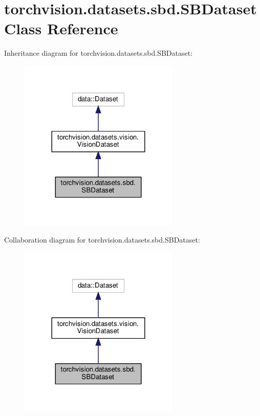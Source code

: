 \hypertarget{classtorchvision_1_1datasets_1_1sbd_1_1SBDataset}{}\section{torchvision.\+datasets.\+sbd.\+S\+B\+Dataset Class Reference}
\label{classtorchvision_1_1datasets_1_1sbd_1_1SBDataset}


Inheritance diagram for torchvision.\+datasets.\+sbd.\+S\+B\+Dataset\+:
\nopagebreak
\begin{figure}[H]
\begin{center}
\leavevmode
\includegraphics[width=216pt]{classtorchvision_1_1datasets_1_1sbd_1_1SBDataset__inherit__graph}
\end{center}
\end{figure}


Collaboration diagram for torchvision.\+datasets.\+sbd.\+S\+B\+Dataset\+:
\nopagebreak
\begin{figure}[H]
\begin{center}
\leavevmode
\includegraphics[width=216pt]{classtorchvision_1_1datasets_1_1sbd_1_1SBDataset__coll__graph}
\end{center}
\end{figure}
